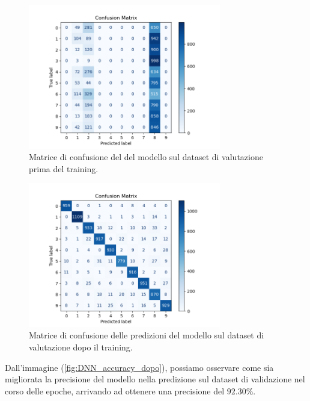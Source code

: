 \begin{figure}[H]
    \centering
    \includegraphics[width=0.75\textwidth]{Immagini/Grafici/confusion_matrix_prima.png}
    \caption{Matrice di confusione del del modello sul dataset di 
    valutazione prima del training.}
    \label{fig:DNN_con_matrix_prima}
\end{figure}



\begin{figure}[H]
    \centering
    \includegraphics[width=0.75\textwidth]{Immagini/Grafici/confusion_matrix_dopo.png}
    \caption{Matrice di confusione delle predizioni del modello sul dataset 
    di valutazione dopo il training.}
    \label{fig:DNN_con_matrix_dopo}
\end{figure}

Dall'immagine (\ref{fig:DNN_accuracy_dopo}), possiamo osservare come sia migliorata la 
precisione del modello nella predizione sul dataset di validazione nel corso delle 
epoche, arrivando ad ottenere una precisione del $92.30\%$. 

